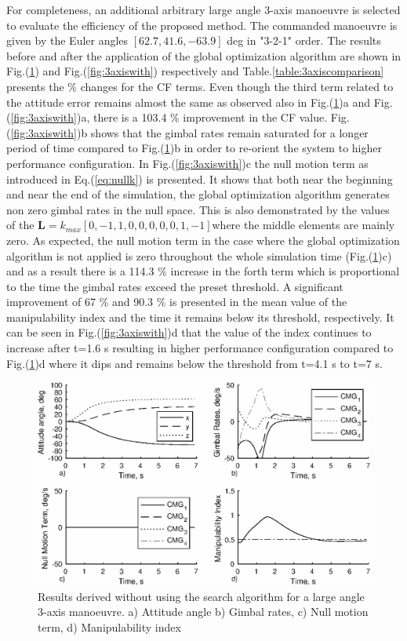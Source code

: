 \documentclass[journal]{new-aiaa}
\begin{document}
For completeness, an additional arbitrary large angle 3-axis manoeuvre is selected to evaluate the efficiency of the proposed method. The commanded manoeuvre is given by the Euler angles $[62.7 ,  41.6,  -63.9]$ deg in "3-2-1" order. The results before and after the application of the global optimization algorithm are shown in Fig.(\ref{fig:3axiswithout}) and Fig.(\ref{fig:3axiswith}) respectively and Table.\ref{table:3axiscomparison} presents the \% changes for the CF terms. Even though the third term related to the attitude error remains almost the same as observed also in Fig.(\ref{fig:3axiswithout})a and Fig.(\ref{fig:3axiswith})a, there is a 103.4 \% improvement in the CF value. Fig.(\ref{fig:3axiswith})b shows that the gimbal rates remain saturated for a longer period of time compared to Fig.(\ref{fig:3axiswithout})b in order to re-orient the system to higher performance configuration. In Fig.(\ref{fig:3axiswith})c the null motion term as introduced in Eq.(\ref{eq:nullk}) is presented. It shows that both near the beginning and near the end of the simulation, the global optimization algorithm generates non zero gimbal rates in the null space. This is also demonstrated by the values of the $\textbf{L}=k_{max}[0  ,  -1,     1 ,    0  ,   0  ,   0 ,    0   ,  0  ,   1 ,   -1]$where the middle elements are mainly zero. As expected, the null motion term in the case where the global optimization algorithm is not applied is zero throughout the whole simulation time (Fig.(\ref{fig:3axiswithout})c) and as a result there is a 114.3 \% increase in the forth term which is proportional to the time the gimbal rates exceed the preset threshold. A significant improvement of 67 \% and 90.3 \% is presented in the mean value of the manipulability index and the time it remains below its threshold, respectively. It can be seen in Fig.(\ref{fig:3axiswith})d that the value of the index continues to increase after t=1.6 s resulting in higher performance configuration compared to Fig.(\ref{fig:3axiswithout})d where it dips and remains below the threshold from t=4.1 s to t=7 s.

\begin{figure}[H]
\centering
\includegraphics[width=6in]{3axiswithout.eps}
\caption{Results derived without using the search algorithm for a large angle 3-axis manoeuvre. a) Attitude angle b) Gimbal rates, c) Null motion term, d) Manipulability index}
\label{fig:3axiswithout}
\end{figure}
\end{document}
